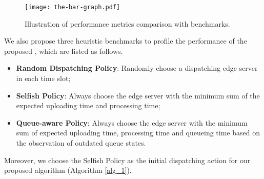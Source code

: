 \begin{figure}[ht]                                                      %
    \centering                                                          %
    \texttt{[image: the-bar-graph.pdf]}               %
    \caption{Illustration of performance metrics comparison with benchmarks.}
    \label{fig:bar_plot}                                                %
\end{figure}                                                            %

We also propose {three heuristic benchmarks to profile the performance of the proposed \algname}, which are listed as follows.
\begin{itemize}
    \item \textbf{Random Dispatching Policy}:
            Randomly choose a dispatching edge server in each time slot; 
    \item \textbf{Selfish Policy}:
            Always choose the edge server with the minimum sum of the expected uploading time and processing time;
    \item \textbf{Queue-aware Policy}:
            Always choose the edge server with the minimum sum of expected uploading time, processing time and queueing time based on the observation of outdated queue states.
\end{itemize}
Moreover, we choose the Selfish Policy as the initial dispatching action for our proposed algorithm (Algorithm \ref{alg_1}).


